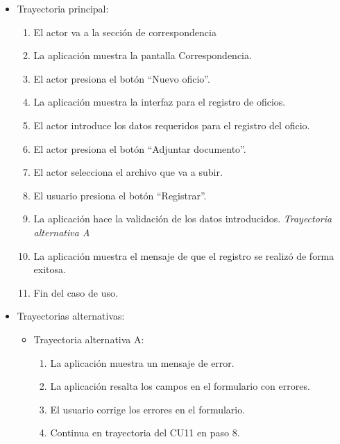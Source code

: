 \begin{itemize}
	\item Trayectoria principal:
	\begin{enumerate}
		\item El actor va a la sección de correspondencia 
		\item La aplicación muestra la pantalla  Correspondencia.
		\item El actor presiona el botón “Nuevo oficio”.
		\item La aplicación muestra la interfaz  para el registro de oficios.
		\item El actor introduce los datos requeridos para el registro del oficio.
		\item El actor presiona el botón “Adjuntar documento”.
		\item El actor selecciona el archivo que va a subir.
		\item El usuario presiona el botón “Registrar”. 
		\item La aplicación hace la validación de los datos introducidos. \textsl{Trayectoria alternativa A} 
		\item La aplicación muestra el mensaje  de que el registro se realizó de forma exitosa.
		\item Fin del caso de uso.
	\end{enumerate}
	
	\item Trayectorias alternativas:
	\begin{itemize}
		\item Trayectoria alternativa A:
			\begin{enumerate}
				\item La aplicación muestra un mensaje de error.
				\item La aplicación resalta los campos en el formulario con errores.
				\item El usuario corrige los errores en el formulario.
				\item Continua en trayectoria del CU11 en paso 8.
			\end{enumerate}
	\end{itemize}
\end{itemize}
